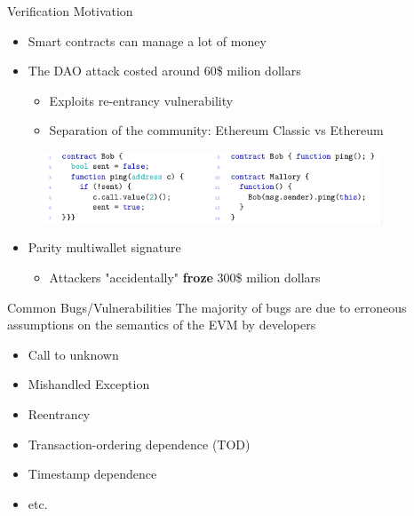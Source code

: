 \begin{frame}{Verification Motivation}
\begin{itemize}
\item Smart contracts can manage a lot of money
\item The DAO attack costed around $60$\$ milion dollars
\begin{itemize}
\item Exploits re-entrancy vulnerability
\item Separation of the community: Ethereum Classic vs Ethereum
\end{itemize}
\end{itemize}

\begin{figure}
\includegraphics[width=0.9\textwidth]{./img/reentrancy}
\end{figure}

\begin{itemize}
\item Parity multiwallet signature
\begin{itemize}
\item Attackers "accidentally" \textbf{froze} $300$\$ milion dollars
\end{itemize}
\end{itemize}

\end{frame}

\begin{frame}{Common Bugs/Vulnerabilities \cite{bib:atzei,luu2016making}}
The majority of bugs are due to erroneous assumptions on the semantics of the EVM by developers
\begin{itemize}
\item Call to unknown
\item Mishandled Exception
\item Reentrancy
\item Transaction-ordering dependence (TOD)
\item Timestamp dependence
\item etc.
\end{itemize}

\end{frame}


